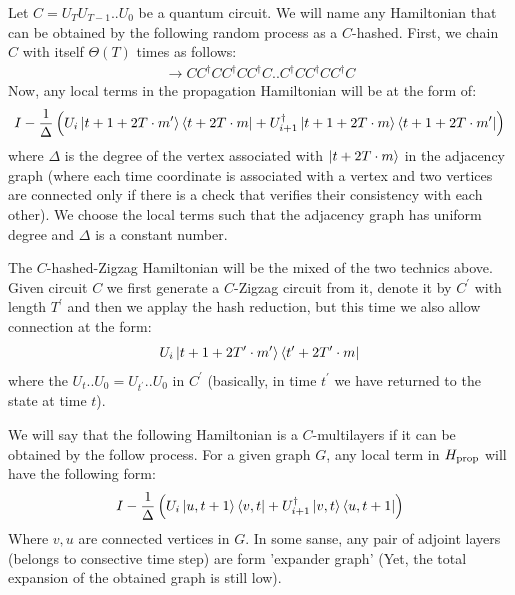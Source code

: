 \documentclass[manuscript,screen,review]{acmart}
\begin{document}
\begin{definition} 
Let $C = U_{T}U_{T-1}..U_{0}$ be a quantum circuit. We will name any Hamiltonian that can be obtained by the following random process as a $C$-hashed. First, we chain $C$ with itself $\Theta(T)$ times as follows:  
  \begin{equation*}
    \begin{split}
      \rightarrow CC^{\dagger}CC^{\dagger}CC^{\dagger}C .. C^{\dagger}CC^{\dagger}CC^{\dagger}C  
    \end{split}
  \end{equation*}
  Now, any local terms in the propagation Hamiltonian will be at the form of: 
  \begin{equation*}
    \begin{split}
      I - \frac{1}{\Delta}  \left(  U_{i}\ket{t + 1 + 2T\cdot m^{\prime}}\bra{ t + 2T\cdot m} + U^{\dagger}_{i+1}\ket{t + 1 + 2T\cdot m}\bra{ t +1 + 2T\cdot m^{\prime}} \right)
    \end{split}
  \end{equation*}
  where $\Delta$ is the degree of the vertex associated with $\ket{ t + 2T \cdot m }$ in the adjacency graph (where each time coordinate is associated with a vertex and two vertices are connected only if there is a check that verifies their consistency with each other). We choose the local terms such that the adjacency graph has uniform degree and $\Delta$ is a constant number.
\end{definition}

\begin{definition}
  The $C$-hashed-Zigzag Hamiltonian will be the mixed of the two technics above. Given circuit $C$ we first generate a $C$-Zigzag circuit from it, denote it by $C^{\prime}$ with length $T^{\prime}$ and then we applay the hash reduction, but this time we also allow connection at the form:
  \begin{equation*}
    \begin{split}
      U_{i}\ket{t + 1 + 2T^{\prime}\cdot m^{\prime}}\bra{ t^{\prime} + 2T^{\prime}\cdot m}
    \end{split}
  \end{equation*}
  where the $U_{t}..U_{0} = U_{t^\prime}..U_{0}$ in $C^{\prime}$ (basically, in time $t^{\prime}$ we have returned to the state at time $t$). 
\end{definition}

\begin{definition}
  We will say that the following Hamiltonian is a $C$-multilayers if it can be obtained by the follow process. For a given graph $G$, any local term in $H_{\text{prop}}$ will have the following form:  
  \begin{equation*}
    \begin{split}
      I -  \frac{1}{\Delta} \left( U_{i}\ket{u,t + 1}\bra{v,t} +   U_{i+1}^{\dagger} \ket{v,t}\bra{u,t+1}\right)
    \end{split}
  \end{equation*}
  Where $v,u$ are connected vertices in $G$. In some sanse, any pair of adjoint layers (belongs to consective time step) are form 'expander graph' (Yet, the total expansion of the obtained graph is still low).
\end{definition}
\end{document}
